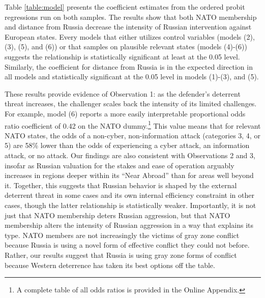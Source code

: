 \documentclass[11pt,letterpaper,pdftex,dvipsnames,table]{article}
\begin{document}


Table \ref{table:model} presents the coefficient estimates from the ordered probit regressions run on both samples. The results show that both NATO membership and distance from Russia decrease the intensity of Russian intervention against European states. Every models that either utilizes control variables (models (2), (3), (5), and (6)) or that samples on plausible relevant states (models (4)-(6)) suggests the relationship is statistically significant at least at the 0.05 level. Similarly, the coefficient for distance from Russia is in the expected direction in all models and statistically significant at the 0.05 level in models (1)-(3), and (5).

These results provide evidence of Observation 1: as the defender's deterrent threat increases, the challenger scales back the intensity of its limited challenges. For example, model (6) reports a more easily interpretable proportional odds ratio coefficient of 0.42 on the NATO dummy.\footnote{A complete table of all odds ratios is provided in the Online Appendix.} This value means that for relevant NATO states, the odds of a non-cyber, non-information attack (categories 3, 4, or 5) are 58\% lower than the odds of experiencing a cyber attack, an information attack, or no attack. Our findings are also consistent with Observations 2 and 3, insofar as Russian valuation for the stakes and ease of operation arguably increases in regions deeper within its ``Near Abroad'' than for areas well beyond it. Together, this suggests that Russian behavior is shaped by the external deterrent threat in some cases and its own internal efficiency constraint in other cases, though the latter relationship is statistically weaker. Importantly, it is not just that NATO membership deters Russian aggression, but that NATO membership alters the intensity of Russian aggression in a way that explains its type. NATO members are not increasingly the victims of gray zone conflict because Russia is using a novel form of effective conflict they could not before. Rather, our results suggest that Russia is using gray zone forms of conflict because Western deterrence has taken its best options off the table.
\end{document}
